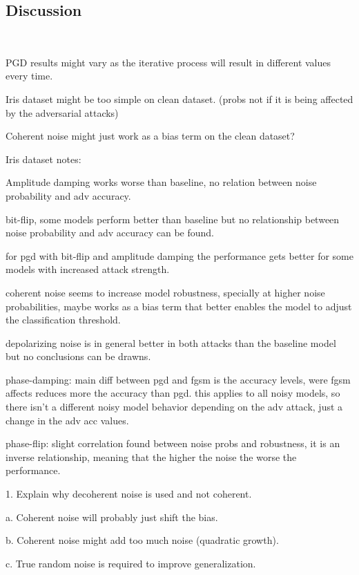 \subsection{Discussion}\label{subsection:discussion} \

PGD results might vary as the iterative process will result in different
values every time. \

Iris dataset might be too simple on clean dataset. (probs not if it is being affected by the adversarial attacks)

Coherent noise might just work as a bias term on the clean dataset? \

Iris dataset notes: \

Amplitude damping works worse than baseline, no relation between noise
probability and adv accuracy. \

bit-flip, some models perform better than baseline but no relationship
between noise probability and adv accuracy can be found. \

for pgd with bit-flip and amplitude damping the performance gets better
for some models with increased attack strength. \

coherent noise seems to increase model robustness, specially at higher noise
probabilities, maybe works as a bias term that better enables the model
to adjust the classification threshold. \

depolarizing noise is in general better in both attacks than the baseline
model but no conclusions can be drawns. \

phase-damping: main diff between pgd and fgsm is the accuracy levels,
were fgsm affects reduces more the accuracy than pgd. this applies to
all noisy models, so there isn't a different noisy model behavior
depending on the adv attack, just a change in the adv acc values. \

phase-flip: slight correlation found between noise probs and robustness,
it is an inverse relationship, meaning that the higher the noise the worse
the performance.


1.	Explain why decoherent noise is used and not coherent. \

  a. Coherent noise will probably just shift the bias. \

  b. Coherent noise might add too much noise (quadratic growth). \

  c. True random noise is required to improve generalization. \


